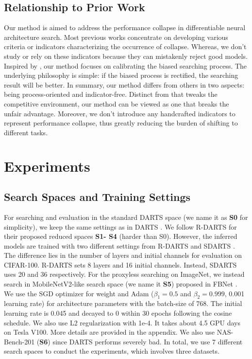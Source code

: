 \documentclass{article} \usepackage{iclr2021_conference,times}
\begin{document}
\subsection{Relationship to Prior Work}
Our  method is aimed to address the performance collapse in differentiable neural architecture search. Most previous works \citep{zela2020understanding,chen2020stabilizing,liang2019darts} concentrate on developing various criteria or indicators characterizing the occurrence of collapse. Whereas, we don't study or rely on these indicators because they can mistakenly reject good models. Inspired by \cite{chu2019fair}, our method focuses on calibrating the biased searching process. The underlying philosophy is simple: if the biased process is rectified, the searching result will be better.  In summary, our method differs from others in two aspects: being process-oriented and indicator-free. Distinct from \cite{chu2019fair} that tweaks the competitive environment, our method can be viewed as one that breaks the unfair advantage. 
Moreover, we don't introduce any handcrafted indicators to represent performance collapse, thus greatly reducing the burden of shifting to different tasks.



\section{Experiments} \label{sec:exp}

\subsection{Search Spaces and Training Settings}\label{sec: training setting}

For searching and evaluation in the standard DARTS space (we name it as \textbf{S0} for simplicity), we keep the same settings as in DARTS \citep{liu2018darts}. We follow R-DARTS \citep{zela2020understanding} for their proposed reduced spaces \textbf{S1- S4} (harder than S0). However, the inferred models are trained with two different settings from R-DARTS \citep{zela2020understanding} and SDARTS \citep{chen2020stabilizing}. The difference lies in the number of layers and initial channels for evaluation on CIFAR-100. R-DARTS sets 8 layers and 16 initial channels. Instead, SDARTS uses 20 and 36 respectively. For the proxyless searching on ImageNet, we instead search in MobileNetV2-like search space (we name it \textbf{S5}) proposed in FBNet \citep{wu2018fbnet}. We use the SGD optimizer for weight  and Adam ($\beta_1=0.5$ and $\beta_2=0.999$, 0.001 learning rate) for architecture parameters with the batch-size of 768. The initial learning rate is 0.045 and decayed to 0 within 30 epochs following the cosine schedule.  We also use L2 regularization with 1e-4.  It takes about 4.5 GPU days on Tesla V100.  More details are provided in the appendix.  We also use NAS-Bench-201 (\textbf{S6}) since DARTS performs severely bad. In total, we use 7 different search spaces to conduct the experiments, which involves three datasets.
\end{document}
